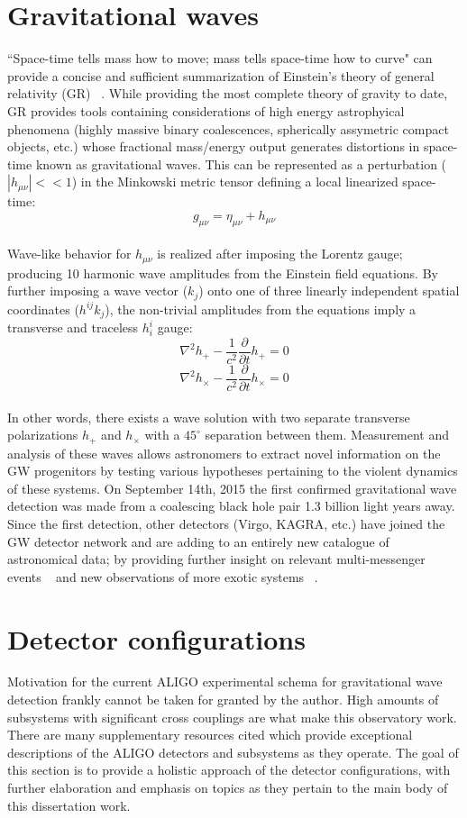 \section{Gravitational waves}
``Space-time tells mass how to move; mass tells space-time how to curve" can provide a concise and sufficient summarization of Einstein's theory of general relativity (GR) ~\cite{Misner1973}. While providing the most complete theory of gravity to date, GR provides tools containing considerations of high energy astrophyical phenomena (highly massive binary coalescences, spherically assymetric compact objects, etc.) whose fractional mass/energy output generates distortions in space-time known as gravitational waves. 
This can be represented as a perturbation ($|h_{\mu \nu}|<<1$) in the Minkowski metric tensor defining a local linearized space-time:
\\
$$g_{\mu \nu} = \eta_{\mu \nu} + h_{\mu \nu}$$
\\
Wave-like behavior for $h_{\mu \nu}$ is realized after imposing the Lorentz gauge; producing 10 harmonic wave amplitudes from the Einstein field equations. By further imposing a wave vector ($k_j$) onto one of three linearly independent spatial coordinates ($h^{ij}k_j$), the non-trivial amplitudes from the equations imply a transverse and traceless $h^{i}_{i}$ gauge:
\\
$$\nabla^2 h_{+} - \frac{1}{c^2} \frac{\partial}{\partial t} h_{+} = 0$$
$$\nabla^2 h_{\times} - \frac{1}{c^2} \frac{\partial}{\partial t} h_{\times} = 0$$
\\
In other words, there exists a wave solution with two separate transverse polarizations $h_{+}$ and $h_{\times}$ with a $45^{\circ}$ separation between them. Measurement and analysis of these waves allows astronomers to extract novel information on the GW progenitors by testing various hypotheses pertaining to the violent dynamics of these systems. On September 14th, 2015 the first confirmed gravitational wave detection was made from a coalescing black hole pair 1.3 billion light years away. Since the first detection, other detectors (Virgo, KAGRA, etc.) have joined the GW detector network and are adding to an entirely new catalogue of astronomical data; by providing further insight on relevant multi-messenger events ~\cite{gw170817} and new observations of more exotic systems ~\cite{Nitz_2023}.


\newpage
\section{Detector configurations}
Motivation for the current ALIGO experimental schema for gravitational wave detection frankly cannot be taken for granted by the author. High amounts of subsystems with significant cross couplings are what make this observatory work. There are many supplementary resources cited which provide exceptional descriptions of the ALIGO detectors and subsystems as they operate. The goal of this section is to provide a holistic approach of the detector configurations, with further elaboration and emphasis on topics as they pertain to the main body of this dissertation work.   

